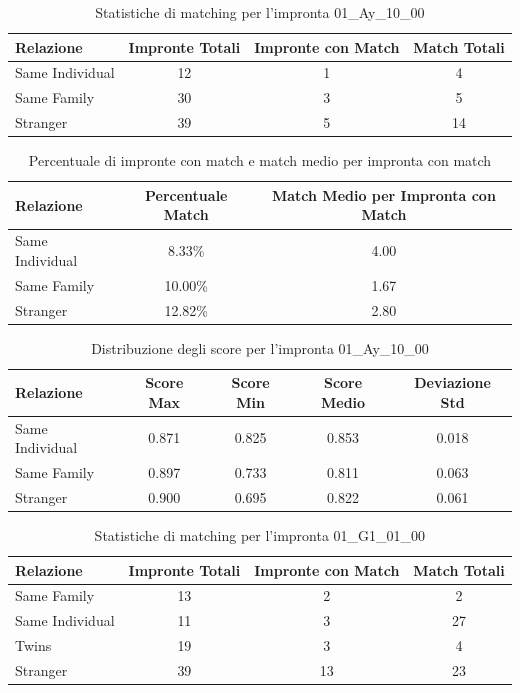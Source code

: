 \begin{table}[htbp]
\centering
\caption{Statistiche di matching per l'impronta 01\_Ay\_10\_00}
\label{tab:results_01_Ay_10_00}
\begin{tabular}{|l|c|c|c|}
\hline
\textbf{Relazione} & \textbf{Impronte Totali} & \textbf{Impronte con Match} & \textbf{Match Totali} \\
\hline
Same Individual & 12 & 1 & 4 \\
\hline
Same Family & 30 & 3 & 5 \\
\hline
Stranger & 39 & 5 & 14 \\
\hline
\end{tabular}
\end{table}


\begin{table}[htbp]
\centering
\caption{Percentuale di impronte con match e match medio per impronta con match}
\label{tab:match_percentage_01_Ay_10_00}
\begin{tabular}{|l|c|c|}
\hline
\textbf{Relazione} & \textbf{Percentuale Match} & \textbf{Match Medio per Impronta con Match} \\
\hline
Same Individual & 8.33\% & 4.00 \\
\hline
Same Family & 10.00\% & 1.67 \\
\hline
Stranger & 12.82\% & 2.80 \\
\hline
\end{tabular}
\end{table}


\begin{table}[htbp]
\centering
\caption{Distribuzione degli score per l'impronta 01\_Ay\_10\_00}
\label{tab:scores_01_Ay_10_00}
\begin{tabular}{|l|c|c|c|c|}
\hline
\textbf{Relazione} & \textbf{Score Max} & \textbf{Score Min} & \textbf{Score Medio} & \textbf{Deviazione Std} \\
\hline
Same Individual & 0.871 & 0.825 & 0.853 & 0.018 \\
\hline
Same Family & 0.897 & 0.733 & 0.811 & 0.063 \\
\hline
Stranger & 0.900 & 0.695 & 0.822 & 0.061 \\
\hline
\end{tabular}
\end{table}


\begin{table}[htbp]
\centering
\caption{Statistiche di matching per l'impronta 01\_G1\_01\_00}
\label{tab:results_01_G1_01_00}
\begin{tabular}{|l|c|c|c|}
\hline
\textbf{Relazione} & \textbf{Impronte Totali} & \textbf{Impronte con Match} & \textbf{Match Totali} \\
\hline
Same Family & 13 & 2 & 2 \\
\hline
Same Individual & 11 & 3 & 27 \\
\hline
Twins & 19 & 3 & 4 \\
\hline
Stranger & 39 & 13 & 23 \\
\hline
\end{tabular}
\end{table}


